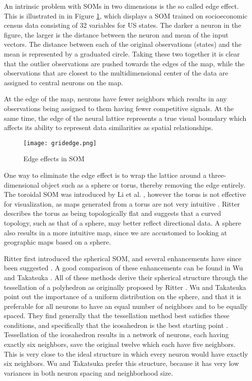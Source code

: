 
An intrinsic problem with SOMs in two dimensions is the so called edge
effect. This is illustrated in  in Figure \ref{f:edge}, which displays a SOM
trained on socioeconomic census data consisting of 32 variables for US states.
The darker a neuron in the figure, the larger is the distance between the
 neuron and mean of the input vectors. The distance between each of the
 original observations (states) and the mean is represented by a graduated
 circle. Taking these two together it is clear that the outlier observations
 are pushed towards the edges of the map, while the observations that are
 closest to the multidimensional center of the data are assigned to central
 neurons on the map.

At the edge of the map, neurons have fewer neighbors which results in any
observations being assigned to them having fewer competitive signals. At the
same time, the edge of the neural lattice represents a true visual boundary
which affects its ability to represent data similarities as spatial
relationships.

\begin{figure}
  \begin{center}
\caption{Edge effects in SOM}\label{f:edge}
  \texttt{[image: gridedge.png]}
\end{center}
\end{figure}

One way to eliminate the edge effect is to wrap the lattice around a
three-dimensional object such as a sphere or torus, thereby removing the edge
entirely. The toroidal SOM was introduced by Li et al. \cite{li1993}, however the torus
is not effective for visualization, as maps generated from a torus are not
very intuitive \cite{ito2000,wu2006}.  Ritter \cite{ritter99} describes the torus as
being topologically flat and suggests that a curved topology, such as that of
a sphere, may better reflect directional data.  A sphere also results in a
more intuitive map, since we are accustomed to looking at geographic maps
based on a sphere.  

\label{bg:sphere}
Ritter \cite{ritter99} first introduced the spherical SOM, and several enhancements have
since been suggested \cite{boudjemai2003,sangole03,Nishio:2006fk,wu2006}.  A
good comparison of these enhancements can be found in Wu and Takatsuka
 \cite{wu2006}.  All of
these methods derive their spherical structure through the tessellation of a
polyhedron as originally proposed by Ritter \cite{ritter99}.  Wu and Takatsuka \cite{wu2006} point
out the importance of a uniform distribution on the sphere, and that it is
preferable for all neurons to have an equal number of neighbors and to be
equally spaced.  They find generally that the tessellation method best satisfies
these conditions, and specifically that the icosahedron is the best starting
point \cite{wu2005}. Tessellation of the icosahedron results in a network of
neurons, each having exactly six neighbors, save the original twelve
which each have five neighbors.  This is very close to the ideal structure in
which every neuron would have exactly six neighbors.  Wu and Takatsuka \cite{wu2006} prefer
this structure, because it has very low variances in both neuron spacing
and neighborhood size. 

